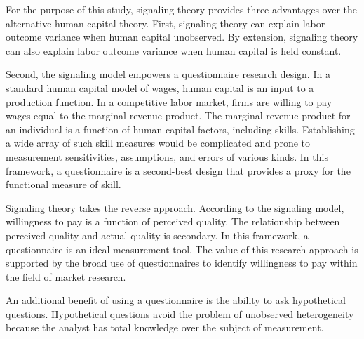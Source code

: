For the purpose of this study, signaling theory provides three advantages over the alternative human capital theory.
First, signaling theory can explain labor outcome variance when human capital unobserved\cite{weiss1995human}.
By extension, signaling theory can also explain labor outcome variance when human capital is held constant.

Second, the signaling model empowers a questionnaire research design.
In a standard human capital model of wages, human capital is an input to a production function\cite{hellerstein2007production}.
In a competitive labor market, firms are willing to pay wages equal to the marginal revenue product.
The marginal revenue product for an individual is a function of human capital factors, including skills.
Establishing a wide array of such skill measures would be complicated and prone to measurement sensitivities, assumptions, and errors of various kinds.
In this framework, a questionnaire is a second-best design that provides a proxy for the functional measure of skill.

Signaling theory takes the reverse approach.
According to the signaling model, willingness to pay is a function of perceived quality.
The relationship between perceived quality and actual quality is secondary.
In this framework, a questionnaire is an ideal measurement tool.
The value of this research approach is supported by the broad use of questionnaires
to identify willingness to pay within the field of market research\cite{ingenbleek2013best}.

An additional benefit of using a questionnaire is the ability to ask hypothetical questions.
Hypothetical questions avoid the problem of unobserved heterogeneity
because the analyst has total knowledge over the subject of measurement.

